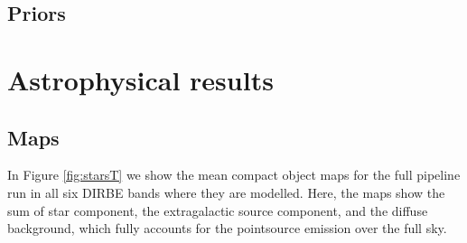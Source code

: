 \documentclass{aa}
\begin{document}
\subsection{Priors}

\section{Astrophysical results}
\label{sec:results}

\subsection{Maps}

In Figure \ref{fig:starsT} we show the mean compact object maps for the full pipeline run in all six DIRBE bands where they are modelled. Here, the maps show the sum of star component, the extragalactic source component, and the diffuse background, which fully accounts for the pointsource emission over the full sky.
\end{document}
